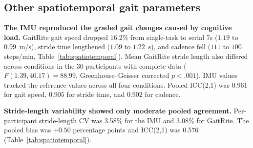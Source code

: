 \documentclass[fleqn,10pt,lineno]{wlpeerj}
\begin{document}
\FloatBarrier
\subsection{Other spatiotemporal gait parameters}

\textbf{The IMU reproduced the graded gait changes caused by cognitive load.} GaitRite gait speed dropped 16.2\% from single-task to serial 7s ($1.19$ to $0.99$~m/s), stride time lengthened ($1.09$ to $1.22$~s), and cadence fell ($111$ to $100$ steps/min, Table~\ref{tab:spatiotemporal}). Mean GaitRite stride length also differed across conditions in the 30 participants with complete data ($F(1.39, 40.17) = 88.99$, Greenhouse--Geisser corrected $p < .001$). IMU values tracked the reference values across all four conditions. Pooled ICC(2,1) was $0.961$ for gait speed, $0.905$ for stride time, and $0.902$ for cadence.

\textbf{Stride-length variability showed only moderate pooled agreement.} Per-participant stride-length CV was 3.58\% for the IMU and 3.08\% for GaitRite. The pooled bias was $+0.50$ percentage points and ICC(2,1) was 0.576 (Table~\ref{tab:spatiotemporal}).
\end{document}
